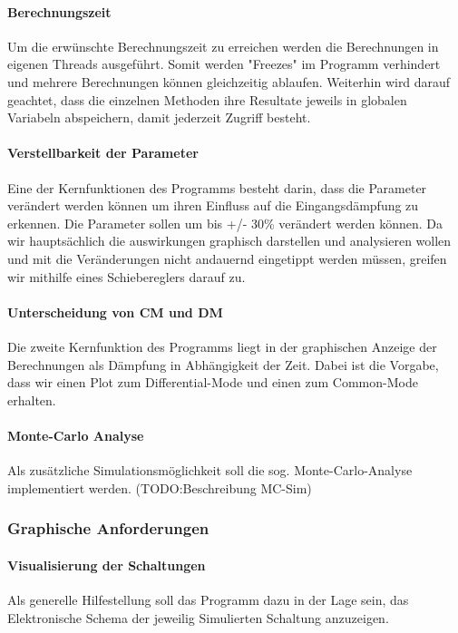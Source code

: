 \paragraph{Berechnungszeit}\label{para:berechnungszeit}
Um die erwünschte Berechnungszeit zu erreichen werden die Berechnungen in eigenen Threads ausgeführt. Somit werden "Freezes" im Programm verhindert und mehrere Berechnungen können gleichzeitig ablaufen. Weiterhin wird darauf geachtet, dass die einzelnen Methoden ihre Resultate jeweils in globalen Variabeln abspeichern, damit jederzeit Zugriff besteht.	
\bigskip
\paragraph{Verstellbarkeit der Parameter}\label{para:verstellbarkeitderparameter}
Eine der Kernfunktionen des Programms besteht darin, dass die Parameter verändert werden können um ihren Einfluss auf die Eingangsdämpfung zu erkennen. Die Parameter sollen um bis +/- 30\% verändert werden können. 		Da wir hauptsächlich die auswirkungen graphisch darstellen und analysieren wollen und mit die Veränderungen nicht andauernd eingetippt werden müssen, greifen wir mithilfe eines Schiebereglers darauf zu. 
\bigskip
\paragraph{Unterscheidung von CM und DM}\label{para:unterscheidcmdm}
		Die zweite Kernfunktion des Programms liegt in der graphischen Anzeige der Berechnungen als Dämpfung in Abhängigkeit der Zeit. Dabei ist die Vorgabe, dass wir einen Plot zum Differential-Mode und einen zum Common-Mode erhalten.
		
\bigskip
\paragraph{Monte-Carlo Analyse}\label{para:montecarlo}
Als zusätzliche Simulationsmöglichkeit soll die sog. Monte-Carlo-Analyse implementiert werden. (TODO:Beschreibung MC-Sim)
		
		
\subsubsection{Graphische Anforderungen} \label{subsubsec:graphischeanforderungen}

\bigskip
{}
\paragraph{Visualisierung der Schaltungen} \label{para:visualisierungderschaltungen}
Als generelle Hilfestellung soll das Programm dazu in der Lage sein, das Elektronische Schema der jeweilig Simulierten Schaltung anzuzeigen.
\bigskip
